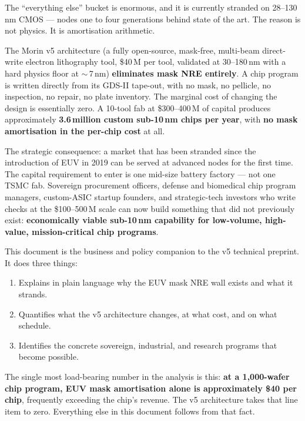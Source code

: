 \documentclass[11pt,letterpaper]{article}
\begin{document}
The ``everything else'' bucket is enormous, and it is currently stranded on 28--130\,nm CMOS --- nodes one to four generations behind state of the art. The reason is not physics. It is amortisation arithmetic.

The Morin v5 architecture (a fully open-source, mask-free, multi-beam direct-write electron lithography tool, \$40\,M per tool, validated at 30--180\,nm with a hard physics floor at $\sim$\,7\,nm) \textbf{eliminates mask NRE entirely}. A chip program is written directly from its GDS-II tape-out, with no mask, no pellicle, no inspection, no repair, no plate inventory. The marginal cost of changing the design is essentially zero. A 10-tool fab at \$300--400\,M of capital produces approximately \textbf{3.6\,million custom sub-10\,nm chips per year}, with \textbf{no mask amortisation in the per-chip cost} at all.

The strategic consequence: a market that has been stranded since the introduction of EUV in 2019 can be served at advanced nodes for the first time. The capital requirement to enter is one mid-size battery factory --- not one TSMC fab. Sovereign procurement officers, defense and biomedical chip program managers, custom-ASIC startup founders, and strategic-tech investors who write checks at the \$100--500\,M scale can now build something that did not previously exist: \textbf{economically viable sub-10\,nm capability for low-volume, high-value, mission-critical chip programs}.

This document is the business and policy companion to the v5 technical preprint. It does three things:

\begin{enumerate}[leftmargin=1.6em]
  \item Explains in plain language why the EUV mask NRE wall exists and what it strands.
  \item Quantifies what the v5 architecture changes, at what cost, and on what schedule.
  \item Identifies the concrete sovereign, industrial, and research programs that become possible.
\end{enumerate}

The single most load-bearing number in the analysis is this: \textbf{at a 1{,}000-wafer chip program, EUV mask amortisation alone is approximately \$40 per chip}, frequently exceeding the chip's revenue. The v5 architecture takes that line item to zero. Everything else in this document follows from that fact.

\end{document}
